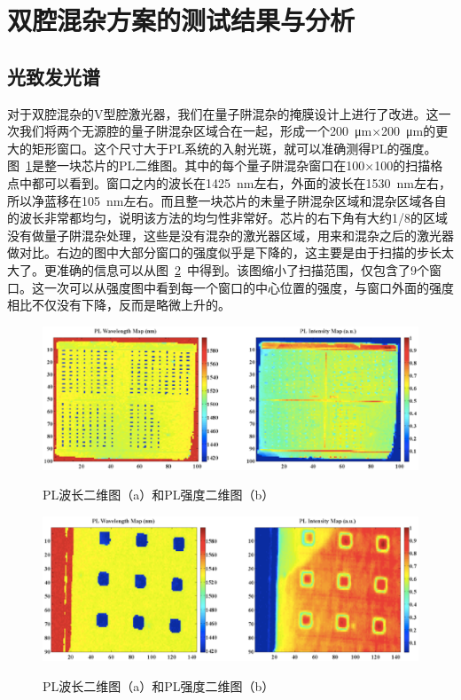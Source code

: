 \documentclass{ZJUthesis}
\begin{document}
\section{双腔混杂方案的测试结果与分析}

\subsection{光致发光谱}

对于双腔混杂的V型腔激光器，我们在量子阱混杂的掩膜设计上进行了改进。这一次我们将两个无源腔的量子阱混杂区域合在一起，形成一个200~μm$\times$200~μm的更大的矩形窗口。这个尺寸大于PL系统的入射光斑，就可以准确测得PL的强度。图~\ref{fig_double_pl}是整一块芯片的PL二维图。其中的每个量子阱混杂窗口在100×100的扫描格点中都可以看到。窗口之内的波长在1425~nm左右，外面的波长在1530~nm左右，所以净蓝移在105~nm左右。而且整一块芯片的未量子阱混杂区域和混杂区域各自的波长非常都均匀，说明该方法的均匀性非常好。芯片的右下角有大约1/8的区域没有做量子阱混杂处理，这些是没有混杂的激光器区域，用来和混杂之后的激光器做对比。右边的图中大部分窗口的强度似乎是下降的，这主要是由于扫描的步长太大了。更准确的信息可以从图~\ref{fig_double_pl2}~中得到。该图缩小了扫描范围，仅包含了9个窗口。这一次可以从强度图中看到每一个窗口的中心位置的强度，与窗口外面的强度相比不仅没有下降，反而是略微上升的。

\begin{figure}[htbp]
  \centering
  \includegraphics[width=1.0\textwidth]{./Pictures/double_pl.eps}\\
  \caption{PL波长二维图（a）和PL强度二维图（b）}
  \label{fig_double_pl}
\end{figure}

\begin{figure}[htbp]
  \centering
  \includegraphics[width=1.0\textwidth]{./Pictures/double_pl2.eps}\\
  \caption{PL波长二维图（a）和PL强度二维图（b）}
  \label{fig_double_pl2}
\end{figure}
\end{document}
